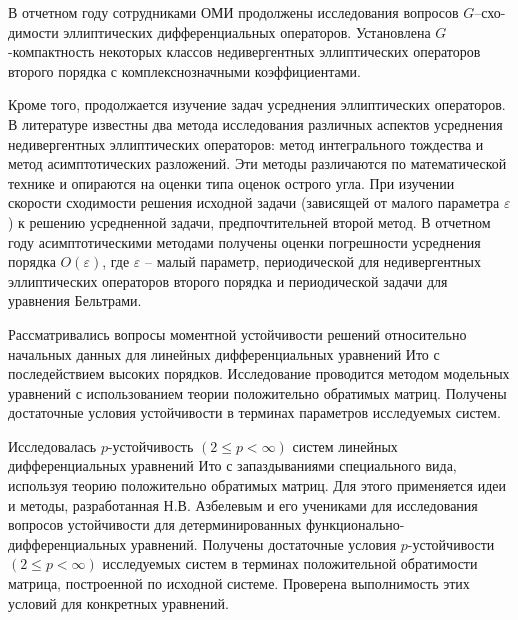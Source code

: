 \Conclusion




В отчетном году сотрудниками ОМИ продолжены исследования вопросов $G$--схо-\linebreak димости %
эллиптических дифференциальных операторов. %
Установлена $G$-компактность некоторых классов недивергентных эллиптических операторов второго порядка с комплекснозначными коэффициентами.

Кроме того, продолжается изучение задач усреднения эллиптических операторов. 
В литературе известны два метода исследования различных аспектов усреднения недивергентных эллиптических операторов: метод интегрального тождества и метод асимптотических разложений. Эти методы различаются по математической технике и опираются на оценки типа оценок острого угла. При изучении скорости сходимости решения исходной задачи (зависящей от малого параметра $\varepsilon$) к решению усредненной задачи, предпочтительней второй метод.
В отчетном году асимптотическими методами получены оценки погрешности усреднения порядка $O(\varepsilon)$, где $\varepsilon$ -- малый параметр, периодической 
для недивергентных эллиптических операторов второго порядка и периодической задачи для уравнения Бельтрами.


Рассматривались вопросы моментной устойчивости решений относительно начальных данных для линейных дифференциальных уравнений Ито с последействием высоких порядков. Исследование проводится методом модельных уравнений с использованием теории положительно обратимых матриц. Получены достаточные условия устойчивости в терминах параметров исследуемых систем.

Исследовалась $p$-устойчивость $(2 \le p < \infty)$ систем линейных дифференциальных уравнений Ито с запаздываниями специального вида, используя теорию положительно обратимых матриц. Для этого применяется идеи и методы, разработанная Н.В. Азбелевым и его учениками для исследования вопросов устойчивости для детерминированных функционально-дифференциальных уравнений. Получены достаточные условия $p$-устойчивости $(2 \le p < \infty)$ исследуемых систем в терминах положительной обратимости матрица, построенной по исходной системе. Проверена  выполнимость этих условий для конкретных уравнений.




